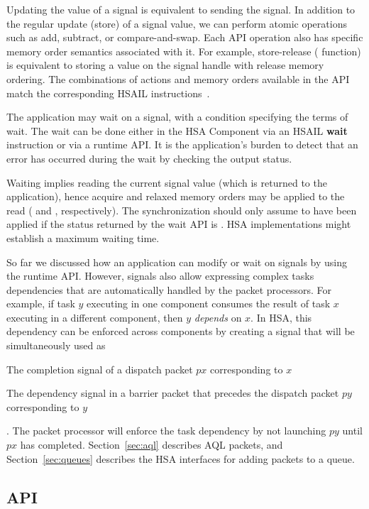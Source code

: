 \documentclass[final]{book}
\newcommand{\reffun}[1]{\textbf{#1}}
\newcommand{\refhsl}[1]{\reffun{#1}}
\begin{document}
Updating the value of a signal is equivalent to sending the signal. In addition
to the regular update (store) of a signal value, we can perform atomic
operations such as add, subtract, or compare-and-swap. Each API operation also
has specific memory order semantics associated with it. For example,
store-release ( function) is equivalent to
storing a value on the signal handle with release memory ordering. The
combinations of actions and memory orders available in the API match the
corresponding HSAIL instructions~\cite{prm}.

The application may wait on a signal, with a condition specifying the terms of
wait. The wait can be done either in the HSA Component via an HSAIL
\refhsl{wait} instruction or via a runtime API. It is the application's burden
to detect that an error has occurred during the wait by checking the output
status.

Waiting implies reading the current signal value (which is returned to the
application), hence acquire and relaxed memory orders may be applied to the read
( and ,
respectively). The synchronization should only assume to have been applied if
the status returned by the wait API is . HSA
implementations might establish a maximum waiting time.

So far we discussed how an application can modify or wait on signals by using
the runtime API. However, signals also allow expressing complex tasks
dependencies that are automatically handled by the packet processors. For
example, if task $y$ executing in one component consumes the result of task $x$
executing in a different component, then $y$ \textit{depends} on $x$. In HSA,
this dependency can be enforced across components by creating a signal that will
be simultaneously used as \begin{inparaenum}[a\upshape)] \item The completion
  signal of a dispatch packet $px$ corresponding to $x$ \item The dependency
  signal in a barrier packet that precedes the dispatch packet $py$
  corresponding to $y$\end{inparaenum}. The packet processor will enforce the
task dependency by not launching $py$ until $px$ has completed.
Section~\ref{sec:aql} describes AQL packets, and Section~\ref{sec:queues}
describes the HSA interfaces for adding packets to a queue.

\subsection{API}

\end{document}
